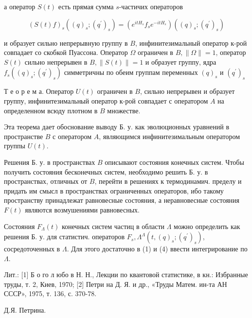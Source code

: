 \documentclass[10pt]{article}
\begin{document}
а оператор $S(t)$ есть прямая сумма $s$-частичих операторов



\[

(S(t) f)_{s}\left((q)_{s} ;\left(q^{\prime}\right)_{s}\right)=\left(e^{i t H_{s}} f_{s} e^{-i t H_{s}}\right)\left((q)_{s} ;\left(q^{\prime}\right)_{s}\right)

\]



и образует сильно непрерывную группу в $B$, инфинитезимальный оператор к-рой совпадает со скобкой Пуассона. Оператор $\Omega$ ограничен в $B,\|\Omega\|=1$, оператор $S(t)$ сильно непрерывен в $B,\|S(t)\|=1$ и образует группу, ядра $f_{s}\left((q)_{s} ;\left(q^{\prime}\right)_{s}\right)$ симметричны по обеим группам переменных $(q)_{s}$ и $\left(q^{\prime}\right)_{s}$



Т е о р е м а. Оператор $U(t)$ ограничен в $B$, сильно непрерывен и образует группу, инфинитезимальный оператор к-рой совпадает с оператором $A$ на определенном всюду плотном в $B$ множестве.



Эта теорема дает обоснование выводу Б. у. как эволюционных уравнений в пространстве $B$ с оператором $A$, являющимся инфинитезимальным оператором группы $U(t)$.



Решения Б. у. в пространствах $B$ описывают состояния конечных систем. Чтобы получить состояния бесконечных систем, необходимо решить Б. у. в пространствах, отличных от $B$, перейти в решениях к термодинамич. пределу и придать им смысл в пространствах ограниченных операторов, ибо такому пространству принадлежат равновесные состояния, а неравновесные состояния $F(t)$ являются возмушениями равновесных.



Состояния $F_{\Lambda}(t)$ конечных систем частиц в области $\Lambda$ можно определить как решения Б. у. для статистич. операторов $F_{s}, \Lambda^{\Lambda}\left(t,(q)_{s} ;\left(q^{\prime}\right)_{s}\right)$, сосредоточенных в $\Lambda$. Для этого достаточно в (1) и (4) ввести интегрирование по $\Lambda$.



Лит.: [1] Б о го л юбо в Н. Н., Лекции по квантовой статистике, в кн.: Избранные труды, т. 2, Киев, 1970; [2] Петри на Д. Я. и др., «Труды Матем. ин-та АН СССР», 1975, т. 136, с. 370-78.



Д.Я. Петрина.
\end{document}
